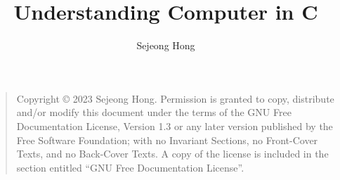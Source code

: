\documentclass{book}
\title{Understanding Computer in C}
\date{}
\author{Sejeong Hong}
\begin{document}
    \frontmatter
    \maketitle
    \begin{quote}
    Copyright \copyright{}  2023 Sejeong Hong.
    Permission is granted to copy, distribute and/or modify this document
    under the terms of the GNU Free Documentation License, Version 1.3
    or any later version published by the Free Software Foundation;
    with no Invariant Sections, no Front-Cover Texts, and no Back-Cover Texts.
    A copy of the license is included in the section entitled ``GNU
    Free Documentation License''.
    \end{quote}
    \tableofcontents
    

    \mainmatter
    

    \appendix
    
\end{document}
